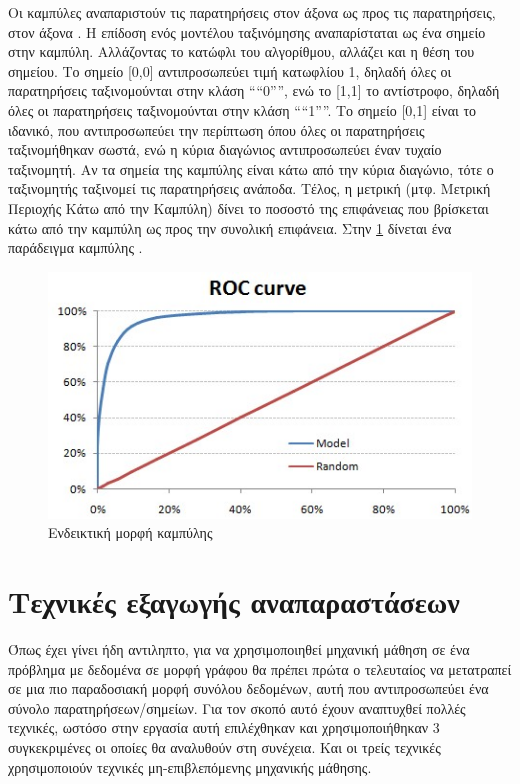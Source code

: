 Οι καμπύλες  αναπαριστούν τις  παρατηρήσεις στον άξονα  ως προς τις
 παρατηρήσεις, στον άξονα . Η επίδοση ενός μοντέλου ταξινόμησης αναπαρίσταται 
ως ένα σημείο στην καμπύλη. Αλλάζοντας το κατώφλι του αλγορίθμου, αλλάζει και η θέση του
σημείου. Το σημείο [0,0] αντιπροσωπεύει τιμή κατωφλίου 1, δηλαδή όλες οι παρατηρήσεις
ταξινομούνται στην κλάση ````0'''', ενώ το [1,1] το αντίστροφο, δηλαδή όλες οι παρατηρήσεις
ταξινομούνται στην κλάση ````1''''. Το σημείο [0,1] είναι το ιδανικό, που αντιπροσωπεύει την
περίπτωση όπου όλες οι παρατηρήσεις ταξινομήθηκαν σωστά, ενώ η κύρια διαγώνιος αντιπροσωπεύει
έναν τυχαίο ταξινομητή. Αν τα σημεία της καμπύλης είναι κάτω από την κύρια διαγώνιο, 
τότε ο ταξινομητής ταξινομεί τις παρατηρήσεις ανάποδα. Τέλος, η μετρική  (μτφ. Μετρική Περιοχής Κάτω από την Καμπύλη)
δίνει το ποσοστό της επιφάνειας που βρίσκεται κάτω από την καμπύλη 
ως προς την συνολική επιφάνεια. Στην \ref{figure1.6} δίνεται ένα παράδειγμα καμπύλης 
.

\begin{figure}[!ht] \centering
\includegraphics[scale = 1]{static/figures/ROC.jpg} 
\caption{Ενδεικτική μορφή καμπύλης  \cite{DataMining}}
\label{figure1.6}
\end{figure}


\section{Τεχνικές εξαγωγής αναπαραστάσεων}

Όπως έχει γίνει ήδη αντιληπτο, για να χρησιμοποιηθεί μηχανική μάθηση σε ένα πρόβλημα με
δεδομένα σε μορφή γράφου θα πρέπει πρώτα ο τελευταίος να μετατραπεί σε μια πιο παραδοσιακή
μορφή συνόλου δεδομένων, αυτή που αντιπροσωπεύει ένα σύνολο παρατηρήσεων/σημείων. Για τον
σκοπό αυτό έχουν αναπτυχθεί πολλές τεχνικές, ωστόσο στην εργασία αυτή επιλέχθηκαν και
χρησιμοποιήθηκαν 3 συγκεκριμένες οι οποίες θα αναλυθούν στη συνέχεια. Και οι τρείς τεχνικές
χρησιμοποιούν τεχνικές μη-επιβλεπόμενης μηχανικής μάθησης.

